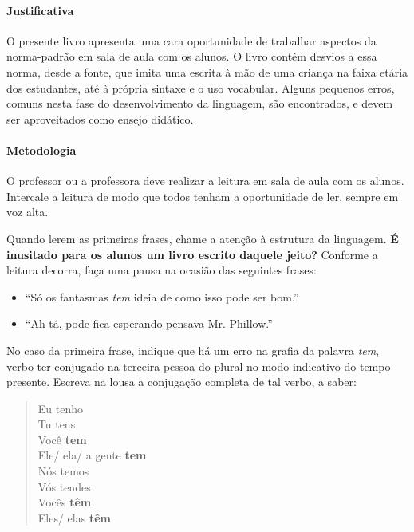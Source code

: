 \documentclass[11pt]{extarticle}
\begin{document}
\paragraph{Justificativa} O presente livro apresenta uma cara oportunidade 
de trabalhar aspectos da norma-padrão em sala de aula com os alunos.
O livro contém desvios a essa norma, desde a fonte, que imita uma escrita à mão de uma criança na faixa etária
dos estudantes, até à própria sintaxe e o uso vocabular. Alguns pequenos erros,
comuns nesta fase do desenvolvimento da linguagem, são encontrados,
e devem ser aproveitados como ensejo didático. 

\paragraph{Metodologia} O professor ou a professora deve realizar a leitura
em sala de aula com os alunos. Intercale a leitura de modo que todos tenham a 
oportunidade de ler, sempre em voz alta. 

Quando lerem as primeiras frases, chame a atenção à estrutura da linguagem.
\textbf{É inusitado para os alunos um livro escrito daquele jeito?}
Conforme a leitura decorra, faça uma pausa na ocasião das seguintes frases:

\begin{itemize}
	\item ``Só os fantasmas \textit{tem} ideia de como isso pode ser bom.''
	\item ``Ah tá, pode fica esperando pensava Mr. Phillow.''
\end{itemize}




No caso da primeira frase, indique que há um erro na grafia da palavra
\textit{tem}, verbo ter conjugado na terceira pessoa do plural 
no modo indicativo do tempo presente. Escreva na lousa a conjugação
completa de tal verbo, a saber:

\begin{verse}
Eu tenho\\
Tu tens\\
Você \textbf{tem}\\
Ele/ ela/ a gente \textbf{tem}\\
Nós temos\\
Vós tendes\\
Vocês \textbf{têm}\\
Eles/ elas \textbf{têm}\\
\end{verse}
\end{document}
